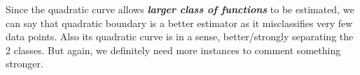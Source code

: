 \documentclass{article}
\newcommand{\bld}[1]{\textbf{#1}}
\newcommand{\ital}[1]{\textit{#1}}
\newcommand{\italb}[1]{\textbf{\textit{#1}}}
\begin{document}
Since the quadratic curve allows \italb{larger class of functions} to be estimated, we can say that quadratic boundary is a better estimator as it misclassifies very few data points. Also its quadratic curve is in a sense, better/strongly separating the 2 classes. But again, we definitely need more instances to comment something stronger.



\end{document}
